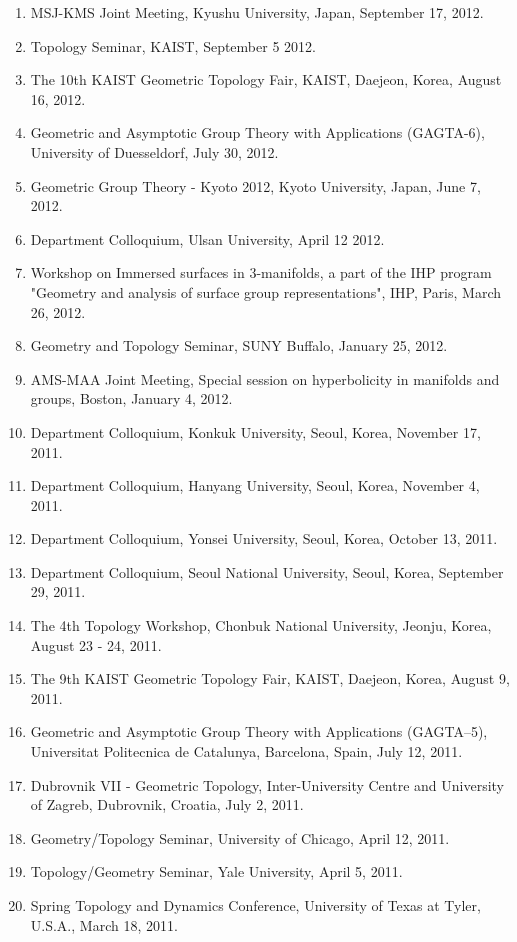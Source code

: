 \documentclass[11pt,a4paper]{article}
\begin{document}
\begin{enumerate}[leftmargin=1.5em, label=\arabic*.]
\item MSJ-KMS Joint Meeting, Kyushu University, Japan, September 17, 2012.
\item Topology Seminar, KAIST, September 5 2012.
\item The 10th KAIST Geometric Topology Fair, KAIST, Daejeon, Korea, August 16, 2012.
\item Geometric and Asymptotic Group Theory with Applications (GAGTA-6), University of Duesseldorf, July 30, 2012.
\item Geometric Group Theory - Kyoto 2012, Kyoto University, Japan, June 7, 2012.
\item Department Colloquium, Ulsan University, April 12 2012.
\item Workshop on Immersed surfaces in 3-manifolds, a part of the IHP program "Geometry and analysis of surface group representations", IHP, Paris, March 26, 2012.
\item Geometry and Topology Seminar, SUNY Buffalo, January 25, 2012.
\item AMS-MAA Joint Meeting, Special session on hyperbolicity in manifolds and groups, Boston, January 4, 2012.
\item Department Colloquium, Konkuk University, Seoul, Korea, November 17, 2011.
\item Department Colloquium, Hanyang University, Seoul, Korea, November 4, 2011.
\item Department Colloquium, Yonsei University, Seoul, Korea, October 13, 2011.
\item Department Colloquium, Seoul National University, Seoul, Korea, September 29, 2011.
\item The 4th Topology Workshop, Chonbuk National University, Jeonju, Korea, August 23 - 24, 2011.
\item The 9th KAIST Geometric Topology Fair, KAIST, Daejeon, Korea, August 9, 2011.
\item Geometric and Asymptotic Group Theory with Applications (GAGTA--5), Universitat Politecnica de Catalunya, Barcelona, Spain, July 12, 2011.
\item Dubrovnik VII - Geometric Topology, Inter-University Centre and University of Zagreb, Dubrovnik, Croatia, July 2, 2011.
\item Geometry/Topology Seminar, University of Chicago, April 12, 2011.
\item Topology/Geometry Seminar, Yale University, April 5, 2011.
\item Spring Topology and Dynamics Conference, University of Texas at Tyler, U.S.A., March 18, 2011.

\end{enumerate}
\end{document}
